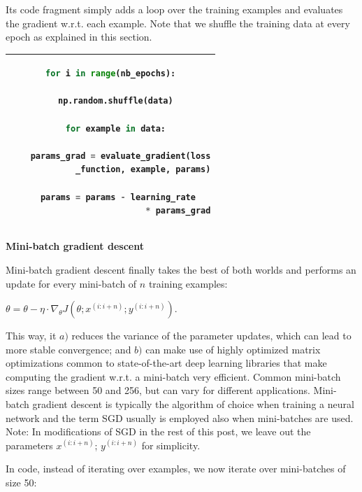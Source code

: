 \documentclass[4pt,journal,compsoc]{IEEEtran}
\begin{document}
\begin{flushleft}
    Its code fragment simply adds a loop over the training examples and evaluates the gradient w.r.t. each example. Note that we shuffle the training data at every epoch as explained in this section. \newline
    
    \begin{tabular}{|||c|} 
        \hline
        \begin{lstlisting}[language=Python]
for i in range(nb_epochs):

  np.random.shuffle(data)
  
  for example in data:
  
    params_grad = evaluate_gradient(loss
             _function, example, params)
                                  
    params = params - learning_rate 
                           * params_grad
        \end{lstlisting} \\
        \hline
        \end{tabular} \newline \newline
    
    \textbf{\Large Mini-batch gradient descent} \newline
    
   Mini-batch gradient descent finally takes the best of both worlds and performs an update for every mini-batch of $n$ training examples: \newline
    
    $\theta = \theta - \eta \cdot \nabla _ \theta J(\theta; x ^ {(i : i + n)}; y ^ {(i : i + n)})$. \newline
    
    This way, it $a)$ reduces the variance of the parameter updates, which can lead to more stable convergence; and $b)$ can make use of highly optimized matrix optimizations common to state-of-the-art deep learning libraries that make computing the gradient w.r.t. a mini-batch very efficient. Common mini-batch sizes range between 50 and 256, but can vary for different applications. Mini-batch gradient descent is typically the algorithm of choice when training a neural network and the term SGD usually is employed also when mini-batches are used. Note: In modifications of SGD in the rest of this post, we leave out the parameters $x ^ {(i : i + n)}$; $y ^ {(i : i + n)}$ for simplicity. \newline
    
    In code, instead of iterating over examples, we now iterate over mini-batches of size 50: \newline
    

\end{flushleft}
\end{document}
